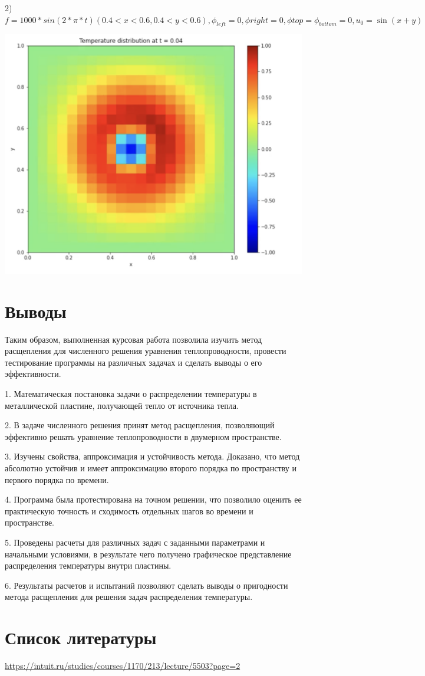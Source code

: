 \documentclass[a4paper]{article}
\begin{document}
2) $f = 1000 * sin(2 * \pi * t) (0.4 < x < 0.6, 0.4 < y < 0.6), \phi_{left} = 0, \phi{right} = 0, \phi{top} = \phi_{bottom} = 0, u_0 = \sin{(x + y)}$

\begin{center}
	\includegraphics[width=500pt]{dymanic.png}
\end{center}

\section{Выводы}

Таким образом, выполненная курсовая работа позволила изучить метод расщепления для численного решения уравнения теплопроводности, провести тестирование программы на различных задачах и сделать выводы о его эффективности.

1. Математическая постановка задачи о распределении температуры в металлической пластине, получающей тепло от источника тепла.

2. В задаче численного решения принят метод расщепления, позволяющий эффективно решать уравнение теплопроводности в двумерном пространстве.

3. Изучены свойства, аппроксимация и устойчивость метода. Доказано, что метод абсолютно устойчив и имеет аппроксимацию второго порядка по пространству и первого порядка по времени.

4. Программа была протестирована на точном решении, что позволило оценить ее практическую точность и сходимость отдельных шагов во времени и пространстве.

5. Проведены расчеты для различных задач с заданными параметрами и начальными условиями, в результате чего получено графическое представление распределения температуры внутри пластины.

6. Результаты расчетов и испытаний позволяют сделать выводы о пригодности метода расщепления для решения задач распределения температуры.



\section{Список литературы}

\url{https://intuit.ru/studies/courses/1170/213/lecture/5503?page=2}
\end{document}

